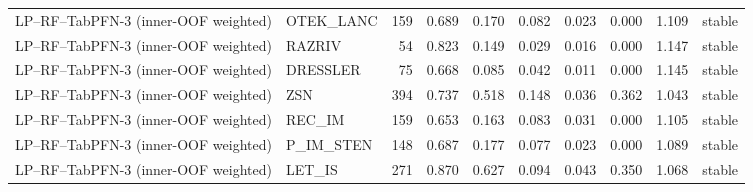 \begin{longtable}{llrrrrrrrl}
LP--RF--TabPFN-3 (inner-OOF weighted) & OTEK\_LANC & 159 & 0.689 & 0.170 & 0.082 & 0.023 & 0.000 & 1.109 & stable \\
LP--RF--TabPFN-3 (inner-OOF weighted) & RAZRIV & 54 & 0.823 & 0.149 & 0.029 & 0.016 & 0.000 & 1.147 & stable \\
LP--RF--TabPFN-3 (inner-OOF weighted) & DRESSLER & 75 & 0.668 & 0.085 & 0.042 & 0.011 & 0.000 & 1.145 & stable \\
LP--RF--TabPFN-3 (inner-OOF weighted) & ZSN & 394 & 0.737 & 0.518 & 0.148 & 0.036 & 0.362 & 1.043 & stable \\
LP--RF--TabPFN-3 (inner-OOF weighted) & REC\_IM & 159 & 0.653 & 0.163 & 0.083 & 0.031 & 0.000 & 1.105 & stable \\
LP--RF--TabPFN-3 (inner-OOF weighted) & P\_IM\_STEN & 148 & 0.687 & 0.177 & 0.077 & 0.023 & 0.000 & 1.089 & stable \\
LP--RF--TabPFN-3 (inner-OOF weighted) & LET\_IS & 271 & 0.870 & 0.627 & 0.094 & 0.043 & 0.350 & 1.068 & stable \\
\end{longtable}
